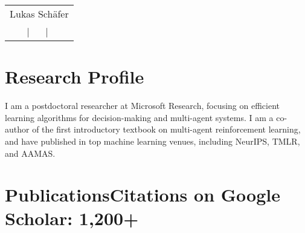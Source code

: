\documentclass[a4paper,12pt]{article}
\begin{document}
\nocite{*}

\pagestyle{empty} 



\begin{tabularx}{\linewidth}{@{} C @{}}
\Huge{Lukas Sch\"afer} \\[7.5pt]
 \ $|$ \
 \ $|$ \
 \\
\end{tabularx}

\section{Research Profile}
I am a postdoctoral researcher at Microsoft Research, focusing on efficient learning algorithms for decision-making and multi-agent systems. I am a co-author of the first introductory textbook on multi-agent reinforcement learning, and have published in top machine learning venues, including NeurIPS, TMLR, and AAMAS. %

\section{Publications\hfill {\large Citations on Google Scholar: 1,200+}}
\end{document}
